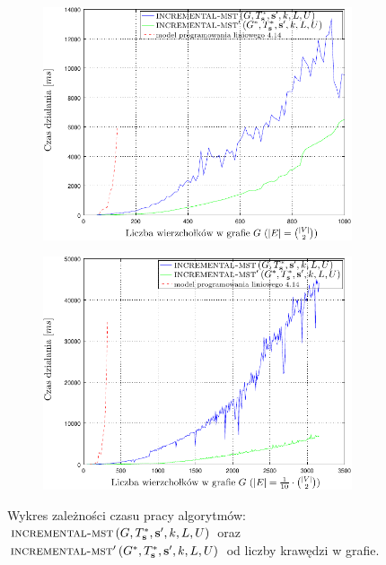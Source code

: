 \begin{figure}[!htbp]
	\null\hfill
	\begin{subfigure}[b]{0.45\textwidth}
		\includegraphics[width=\textwidth]{Chapter_VI/IMST1-example/IMST1_psfrag}
		\caption{}
		\label{fig:imst1:a}
	\end{subfigure}
	\hfill
	\begin{subfigure}[b]{0.45\textwidth}
		\includegraphics[width=\textwidth]{Chapter_VI/IMST3-example/IMST3_psfrag}
		\caption{}
		\label{fig:imst1:c}
	\end{subfigure}
	\hfill\null
	\caption{
		Wykres zależności czasu pracy algorytmów: $\textsc{incremental-mst} \left( G, T^{\ast}_{\textbf{s}}, \textbf{s}^{\prime}, k, L, U \right)$ oraz $\textsc{incremental-mst}^{\prime} \left( G^{\ast}, T^{\ast}_{\textbf{s}}, \textbf{s}^{\prime}, k, L, U \right)$ od liczby krawędzi w grafie.
	}
	\label{fig:imst1}
\end{figure}

